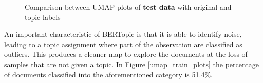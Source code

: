 \documentclass[a4paper]{article}
\begin{document}
\begin{figure}[H]
  \centering
  \caption{Comparison between UMAP plots of \textbf{test data} with original and topic labels}
  \label{umap_test_plots}
\end{figure}

An important characteristic of BERTopic is that it is able to identify noise, leading to a topic assignment where part of the observation are classified as outliers. This produces a cleaner map to explore the documents at the loss of samples that are not given a topic. In Figure \ref{umap_train_plots} the percentage of documents classified into the aforementioned category is 51.4\%.
\end{document}
